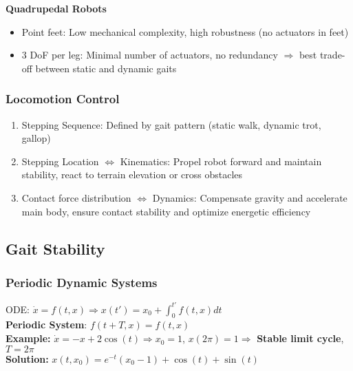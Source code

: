 \documentclass[fontsize=6pt]{scrartcl}
\renewcommand{\exp}[1]{e^{#1}}
\begin{document}
\begin{multicols*}{4}
\textbf{Quadrupedal Robots}
\begin{itemize}
	\item Point feet: Low mechanical complexity, high robustness (no actuators in feet)
	\item 3 DoF per leg: Minimal number of actuators, no redundancy $\Rightarrow$ best trade-off
		  between static and dynamic gaits
\end{itemize}

\subsubsection*{Locomotion Control}
\begin{enumerate}
	\item Stepping Sequence: Defined by gait pattern (static walk, dynamic trot, gallop)
	\item Stepping Location $\Leftrightarrow$ Kinematics: Propel robot forward and maintain stability,
		  react to terrain elevation or cross obstacles
	\item Contact force distribution $\Leftrightarrow$ Dynamics: Compensate gravity
		  and accelerate main body, ensure contact stability and optimize energetic efficiency
\end{enumerate}

\subsection*{Gait Stability}
\subsubsection*{Periodic Dynamic Systems}
ODE: $\dot{x} = f(t,x) \Rightarrow x(t') = x_0 + \int_0^{t'}f(t,x)dt$\\
\textbf{Periodic System}: $f(t+T, x)=f(t,x)$\\
\textbf{Example:} $\dot{x} = -x + 2\cos(t) \Rightarrow x_0 = 1$, $x(2\pi) = 1\Rightarrow$
\textbf{Stable limit cycle}, $T=2\pi$\\
\textbf{Solution:} $x(t,x_0)=\exp{-t}(x_0-1)+\cos(t)+\sin(t)$


\end{multicols*}
\end{document}
